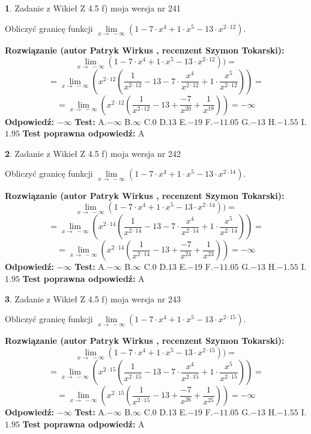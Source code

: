 \documentclass[12pt, a4paper]{article}
\theoremstyle{definition} %
\newtheorem{zad}{}
\newcommand{\zadStart}[1]{\begin{zad}#1\newline}
\newcommand{\zadStop}{\end{zad}}
\newcommand{\rozwStart}[2]{\noindent \textbf{Rozwiązanie (autor #1 , recenzent #2): }\newline}
\newcommand{\rozwStop}{\newline}
\newcommand{\odpStart}{\noindent \textbf{Odpowiedź:}\newline}
\newcommand{\odpStop}{\newline}
\newcommand{\testStart}{\noindent \textbf{Test:}\newline}
\newcommand{\testStop}{\newline}
\newcommand{\kluczStart}{\noindent \textbf{Test poprawna odpowiedź:}\newline}
\newcommand{\kluczStop}{\newline}
\begin{document}
\zadStart{Zadanie z Wikieł Z 4.5 f) moja wersja nr 241}


Obliczyć granicę funkcji  $\lim\limits_{x\to\ -\infty}(1 - 7 \cdot x^{4}+1 \cdot x^{5}- 13 \cdot x^{2\cdot12})$.
\zadStop
\rozwStart{Patryk Wirkus}{Szymon Tokarski}
$$\lim\limits_{x\to\ -\infty}(1 - 7 \cdot x^{4}+1 \cdot x^{5}- 13 \cdot x^{2\cdot12}))=$$
$$=\lim\limits_{x\to\ -\infty}(x^{2\cdot12}(\frac{1}{x^{2\cdot12}}-13 -7 \cdot \frac{x^{4}}{x^{2\cdot12}}+1 \cdot \frac{x^{5}}{x^{2\cdot12}}))=$$
$$=\lim\limits_{x\to\ -\infty}(x^{2\cdot12}(\frac{1}{x^{2\cdot12}}-13 + \frac{-7}{x^{20}}+ \frac{1}{x^{19}}))=-\infty$$
\rozwStop
\odpStart
$-\infty$
\odpStop
\testStart
A.$-\infty$ B.$\infty$ C.$0$ D.$13$ E.$-19$
F.$-11.05$ G.$-13$
H.$-1.55$
I.$1.95$
\testStop
\kluczStart
A
\kluczStop



\zadStart{Zadanie z Wikieł Z 4.5 f) moja wersja nr 242}


Obliczyć granicę funkcji  $\lim\limits_{x\to\ -\infty}(1 - 7 \cdot x^{4}+1 \cdot x^{5}- 13 \cdot x^{2\cdot14})$.
\zadStop
\rozwStart{Patryk Wirkus}{Szymon Tokarski}
$$\lim\limits_{x\to\ -\infty}(1 - 7 \cdot x^{4}+1 \cdot x^{5}- 13 \cdot x^{2\cdot14}))=$$
$$=\lim\limits_{x\to\ -\infty}(x^{2\cdot14}(\frac{1}{x^{2\cdot14}}-13 -7 \cdot \frac{x^{4}}{x^{2\cdot14}}+1 \cdot \frac{x^{5}}{x^{2\cdot14}}))=$$
$$=\lim\limits_{x\to\ -\infty}(x^{2\cdot14}(\frac{1}{x^{2\cdot14}}-13 + \frac{-7}{x^{24}}+ \frac{1}{x^{23}}))=-\infty$$
\rozwStop
\odpStart
$-\infty$
\odpStop
\testStart
A.$-\infty$ B.$\infty$ C.$0$ D.$13$ E.$-19$
F.$-11.05$ G.$-13$
H.$-1.55$
I.$1.95$
\testStop
\kluczStart
A
\kluczStop



\zadStart{Zadanie z Wikieł Z 4.5 f) moja wersja nr 243}


Obliczyć granicę funkcji  $\lim\limits_{x\to\ -\infty}(1 - 7 \cdot x^{4}+1 \cdot x^{5}- 13 \cdot x^{2\cdot15})$.
\zadStop
\rozwStart{Patryk Wirkus}{Szymon Tokarski}
$$\lim\limits_{x\to\ -\infty}(1 - 7 \cdot x^{4}+1 \cdot x^{5}- 13 \cdot x^{2\cdot15}))=$$
$$=\lim\limits_{x\to\ -\infty}(x^{2\cdot15}(\frac{1}{x^{2\cdot15}}-13 -7 \cdot \frac{x^{4}}{x^{2\cdot15}}+1 \cdot \frac{x^{5}}{x^{2\cdot15}}))=$$
$$=\lim\limits_{x\to\ -\infty}(x^{2\cdot15}(\frac{1}{x^{2\cdot15}}-13 + \frac{-7}{x^{26}}+ \frac{1}{x^{25}}))=-\infty$$
\rozwStop
\odpStart
$-\infty$
\odpStop
\testStart
A.$-\infty$ B.$\infty$ C.$0$ D.$13$ E.$-19$
F.$-11.05$ G.$-13$
H.$-1.55$
I.$1.95$
\testStop
\kluczStart
A
\kluczStop
\end{document}
